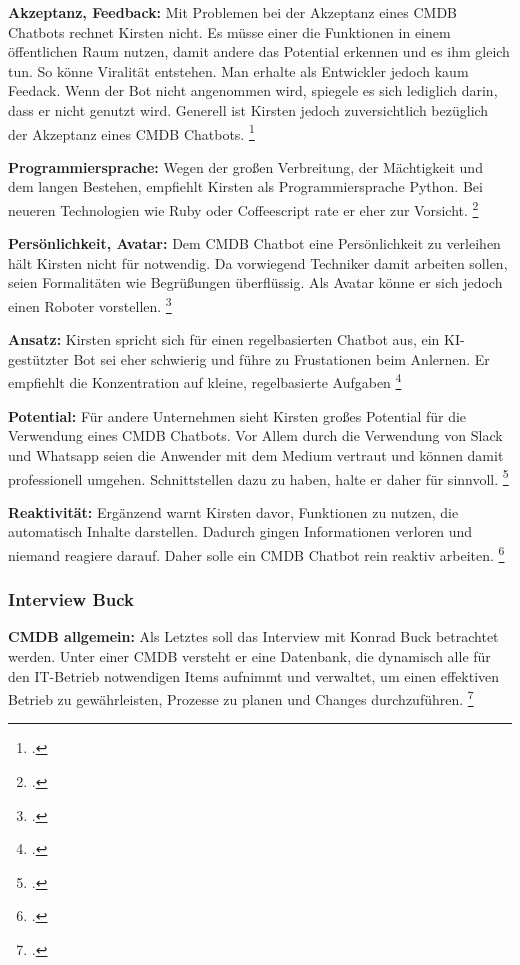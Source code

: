 \textbf{Akzeptanz, Feedback: }Mit Problemen bei der Akzeptanz eines \acs{CMDB} Chatbots rechnet Kirsten nicht. Es müsse einer die Funktionen in einem öffentlichen Raum nutzen, damit andere das Potential erkennen und es ihm gleich tun. So könne Viralität entstehen. Man erhalte als Entwickler jedoch kaum Feedack. Wenn der Bot nicht angenommen wird, spiegele es sich lediglich darin, dass er nicht genutzt wird. Generell ist Kirsten jedoch zuversichtlich bezüglich der Akzeptanz eines \acs{CMDB} Chatbots.
\footcite[Vgl.][o. \pno]{Kirsten_2019}

\textbf{Programmiersprache: }Wegen der großen Verbreitung, der Mächtigkeit und dem langen Bestehen, empfiehlt Kirsten als Programmiersprache Python. Bei neueren Technologien wie Ruby oder Coffeescript rate er eher zur Vorsicht. 
\footcite[Vgl.][o. \pno]{Kirsten_2019}

\textbf{Persönlichkeit, Avatar: }Dem CMDB Chatbot eine Persönlichkeit zu verleihen hält Kirsten nicht für notwendig. Da vorwiegend Techniker damit arbeiten sollen, seien Formalitäten wie Begrüßungen überflüssig. Als Avatar könne er sich jedoch einen Roboter vorstellen. 
\footcite[Vgl.][o. \pno]{Kirsten_2019}

\textbf{Ansatz: }Kirsten spricht sich für einen regelbasierten Chatbot aus, ein KI-gestützter Bot sei eher schwierig und führe zu Frustationen beim Anlernen. Er empfiehlt die Konzentration auf \glqq{}kleine, regelbasierte Aufgaben\grqq
\footcites[][o. \pno]{Kirsten_2019}[Vgl.][o. \pno]{Kirsten_2019}

\textbf{Potential: }Für andere Unternehmen sieht Kirsten großes Potential für die Verwendung eines \acs{CMDB} Chatbots. Vor Allem durch die Verwendung von Slack und Whatsapp seien die Anwender mit dem Medium vertraut und können damit professionell umgehen. Schnittstellen dazu zu haben, halte er daher für sinnvoll.
\footcite[Vgl.][o. \pno]{Kirsten_2019}

\textbf{Reaktivität: }Ergänzend warnt Kirsten davor, Funktionen zu nutzen, die automatisch Inhalte darstellen. Dadurch gingen Informationen verloren und niemand reagiere darauf. Daher solle ein \acs{CMDB} Chatbot rein reaktiv arbeiten. 
\footcite[Vgl.][o. \pno]{Kirsten_2019}



\subsubsection{Interview Buck}
\textbf{\acs{CMDB} allgemein: }Als Letztes soll das Interview mit Konrad Buck betrachtet werden. Unter einer \acs{CMDB} versteht er eine Datenbank, die dynamisch alle für den IT-Betrieb notwendigen Items aufnimmt und verwaltet, um einen effektiven Betrieb zu gewährleisten, Prozesse zu planen und Changes durchzuführen.
\footcite[Vgl.][o. \pno]{Buck_2019}

